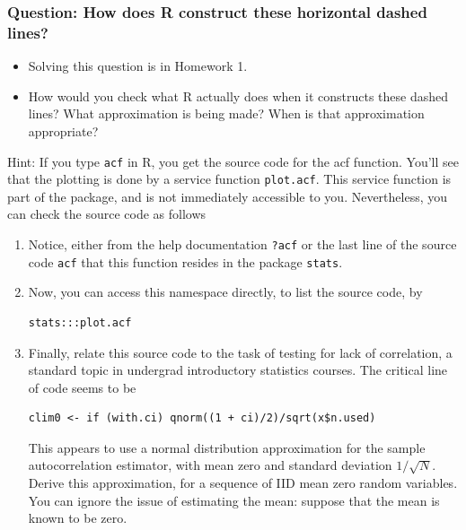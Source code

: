 \documentclass[]{article}
\begin{document}
\subsubsection{Question: How does R construct these horizontal dashed
lines?}\label{question-how-does-r-construct-these-horizontal-dashed-lines}

\begin{itemize}
\item
  Solving this question is in Homework 1.
\item
  How would you check what R actually does when it constructs these
  dashed lines? What approximation is being made? When is that
  approximation appropriate?
\end{itemize}

Hint: If you type \texttt{acf} in R, you get the source code for the acf
function. You'll see that the plotting is done by a service function
\texttt{plot.acf}. This service function is part of the package, and is
not immediately accessible to you. Nevertheless, you can check the
source code as follows

\begin{enumerate}
\def\labelenumi{\arabic{enumi}.}
\item
  Notice, either from the help documentation \texttt{?acf} or the last
  line of the source code \texttt{acf} that this function resides in the
  package \texttt{stats}.
\item
  Now, you can access this namespace directly, to list the source code,
  by

\begin{verbatim}
stats:::plot.acf
\end{verbatim}
\item
  Finally, relate this source code to the task of testing for lack of
  correlation, a standard topic in undergrad introductory statistics
  courses. The critical line of code seems to be

\begin{verbatim}
clim0 <- if (with.ci) qnorm((1 + ci)/2)/sqrt(x$n.used)
\end{verbatim}

  This appears to use a normal distribution approximation for the sample
  autocorrelation estimator, with mean zero and standard deviation
  \(1/\sqrt{N}\). Derive this approximation, for a sequence of IID mean
  zero random variables. You can ignore the issue of estimating the
  mean: suppose that the mean is known to be zero.
\end{enumerate}
\end{document}
